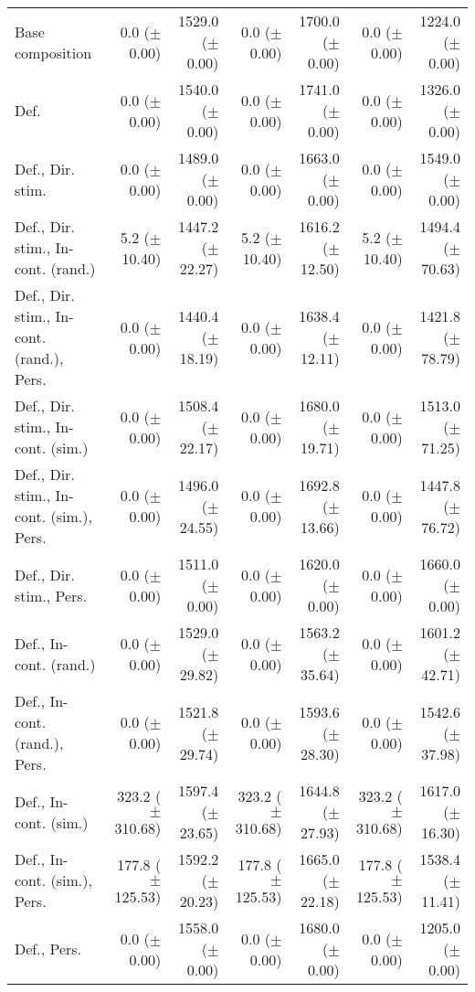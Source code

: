 \begin{table*}
\begin{tabular}{lrrrrrr}
        Base composition & 0.0 ($\pm$ 0.00) & 1529.0 ($\pm$ 0.00) & 0.0 ($\pm$ 0.00) & 1700.0 ($\pm$ 0.00) & 0.0 ($\pm$ 0.00) & 1224.0 ($\pm$ 0.00) \\
        Def. & 0.0 ($\pm$ 0.00) & 1540.0 ($\pm$ 0.00) & 0.0 ($\pm$ 0.00) & 1741.0 ($\pm$ 0.00) & 0.0 ($\pm$ 0.00) & 1326.0 ($\pm$ 0.00) \\
        Def., Dir. stim. & 0.0 ($\pm$ 0.00) & 1489.0 ($\pm$ 0.00) & 0.0 ($\pm$ 0.00) & 1663.0 ($\pm$ 0.00) & 0.0 ($\pm$ 0.00) & 1549.0 ($\pm$ 0.00) \\
        Def., Dir. stim., In-cont. (rand.) & 5.2 ($\pm$ 10.40) & 1447.2 ($\pm$ 22.27) & 5.2 ($\pm$ 10.40) & 1616.2 ($\pm$ 12.50) & 5.2 ($\pm$ 10.40) & 1494.4 ($\pm$ 70.63) \\
        Def., Dir. stim., In-cont. (rand.), Pers. & 0.0 ($\pm$ 0.00) & 1440.4 ($\pm$ 18.19) & 0.0 ($\pm$ 0.00) & 1638.4 ($\pm$ 12.11) & 0.0 ($\pm$ 0.00) & 1421.8 ($\pm$ 78.79) \\
        Def., Dir. stim., In-cont. (sim.) & 0.0 ($\pm$ 0.00) & 1508.4 ($\pm$ 22.17) & 0.0 ($\pm$ 0.00) & 1680.0 ($\pm$ 19.71) & 0.0 ($\pm$ 0.00) & 1513.0 ($\pm$ 71.25) \\
        Def., Dir. stim., In-cont. (sim.), Pers. & 0.0 ($\pm$ 0.00) & 1496.0 ($\pm$ 24.55) & 0.0 ($\pm$ 0.00) & 1692.8 ($\pm$ 13.66) & 0.0 ($\pm$ 0.00) & 1447.8 ($\pm$ 76.72) \\
        Def., Dir. stim., Pers. & 0.0 ($\pm$ 0.00) & 1511.0 ($\pm$ 0.00) & 0.0 ($\pm$ 0.00) & 1620.0 ($\pm$ 0.00) & 0.0 ($\pm$ 0.00) & 1660.0 ($\pm$ 0.00) \\
        Def., In-cont. (rand.) & 0.0 ($\pm$ 0.00) & 1529.0 ($\pm$ 29.82) & 0.0 ($\pm$ 0.00) & 1563.2 ($\pm$ 35.64) & 0.0 ($\pm$ 0.00) & 1601.2 ($\pm$ 42.71) \\
        Def., In-cont. (rand.), Pers. & 0.0 ($\pm$ 0.00) & 1521.8 ($\pm$ 29.74) & 0.0 ($\pm$ 0.00) & 1593.6 ($\pm$ 28.30) & 0.0 ($\pm$ 0.00) & 1542.6 ($\pm$ 37.98) \\
        Def., In-cont. (sim.) & 323.2 ($\pm$ 310.68) & 1597.4 ($\pm$ 23.65) & 323.2 ($\pm$ 310.68) & 1644.8 ($\pm$ 27.93) & 323.2 ($\pm$ 310.68) & 1617.0 ($\pm$ 16.30) \\
        Def., In-cont. (sim.), Pers. & 177.8 ($\pm$ 125.53) & 1592.2 ($\pm$ 20.23) & 177.8 ($\pm$ 125.53) & 1665.0 ($\pm$ 22.18) & 177.8 ($\pm$ 125.53) & 1538.4 ($\pm$ 11.41) \\
        Def., Pers. & 0.0 ($\pm$ 0.00) & 1558.0 ($\pm$ 0.00) & 0.0 ($\pm$ 0.00) & 1680.0 ($\pm$ 0.00) & 0.0 ($\pm$ 0.00) & 1205.0 ($\pm$ 0.00) \\

\end{tabular}
\end{table*}
